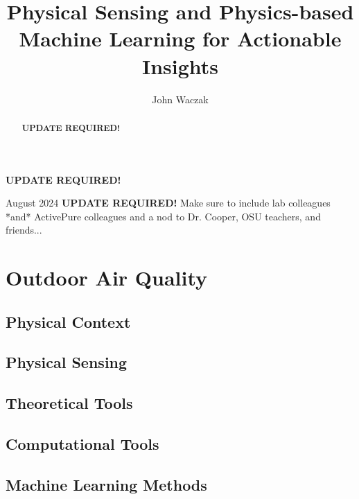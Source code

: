 \documentclass[doublespacing]{utdthesis}
\author{John Waczak}
\title{Physical Sensing and Physics-based Machine Learning for Actionable Insights}
\begin{document}
\frontmatter

\signaturepage


\begin{dedication} %
  \color{red}
  \textbf{UPDATE REQUIRED!}
\end{dedication}


\maketitle

\begin{acks}{August 2024} %
  \color{red}
  \textbf{UPDATE REQUIRED!} Make sure to include lab colleagues *and* ActivePure colleagues and a nod to Dr. Cooper, OSU teachers, and friends...
\end{acks}

\begin{abstract}
  \color{red}
  \textbf{UPDATE REQUIRED!}
\end{abstract}

\tableofcontents
\listoffigures %
\listoftables %

\mainmatter







\chapter{Outdoor Air Quality}
\section{Physical Context}
\section{Physical Sensing}
\section{Theoretical Tools}
\section{Computational Tools}
\section{Machine Learning Methods}
\end{document}
